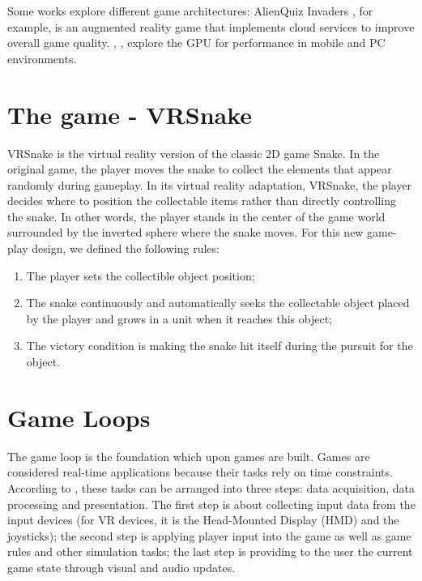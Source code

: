 \documentclass[runningheads]{llncs}
\begin{document}
Some works explore different game architectures: AlienQuiz Invaders \cite{Loop2012}, for example, is an augmented reality game that implements cloud services to improve overall game quality. \cite{MobileWars}, \cite{joselli2009gpuwars}, \cite{GameArchitecture2009} explore the GPU for performance in mobile and PC environments.




\section{The game - VRSnake} \label{sec:vrsnake}
VRSnake is the virtual reality version of the classic 2D game Snake.
In the original game, the player moves the snake to collect the elements that appear randomly during gameplay. In its virtual reality adaptation, VRSnake, the player decides where to position the collectable items rather than directly controlling the snake. In other words, the player stands in the center of the game world surrounded by the inverted sphere where the snake moves. 
For this new game-play design, we defined the following rules:

\begin{enumerate}
\item The player sets the collectible object position;
\item The snake continuously and automatically seeks the collectable object placed by the player and grows in a unit when it reaches this object;
\item The victory condition is making the snake hit itself during the pursuit for the object.
\end{enumerate}

\section{Game Loops} \label{sec:game-loops}
The game loop is the foundation which upon games are built. Games are considered real-time applications because their tasks rely on time constraints. According to \cite{GameArchitecture2009}, these tasks can be arranged into three steps: data acquisition, data processing and presentation. The first step is about collecting input data from the input devices (for VR devices, it is the Head-Mounted Display (HMD) and the joysticks); the second step is applying player input into the game as well as game rules and other simulation tasks; the last step is providing to the user the current game state through visual and audio updates. 
\end{document}
